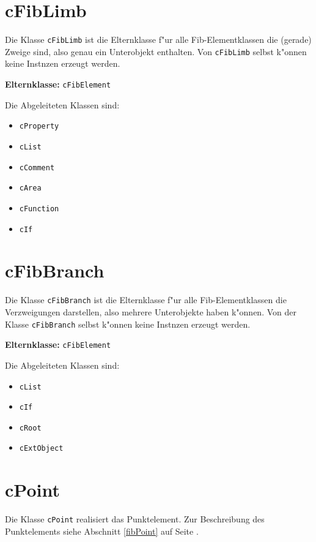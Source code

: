 \section{cFibLimb}
\label{secCFibLimb}

Die Klasse \verb|cFibLimb| ist die Elternklasse f"ur alle Fib-Elementklassen die (gerade) Zweige sind, also genau ein Unterobjekt enthalten. Von \verb|cFibLimb| selbst k"onnen keine Instnzen erzeugt werden.

\bigskip\noindent
\textbf{Elternklasse:} \verb|cFibElement|

\bigskip\noindent
Die Abgeleiteten Klassen sind:
\begin{itemize}
 \item \verb|cProperty|
 \item \verb|cList|
 \item \verb|cComment|
 \item \verb|cArea|
 \item \verb|cFunction|
 \item \verb|cIf|
\end{itemize}


\section{cFibBranch}
\label{secCFibBranch}

Die Klasse \verb|cFibBranch| ist die Elternklasse f"ur alle Fib-Elementklassen die Verzweigungen darstellen, also mehrere Unterobjekte haben k"onnen. Von der Klasse \verb|cFibBranch| selbst k"onnen keine Instnzen erzeugt werden.

\bigskip\noindent
\textbf{Elternklasse:} \verb|cFibElement|

\bigskip\noindent
Die Abgeleiteten Klassen sind:
\begin{itemize}
 \item \verb|cList|
 \item \verb|cIf|
 \item \verb|cRoot|
 \item \verb|cExtObject|
\end{itemize}


\section{cPoint}

Die Klasse \verb|cPoint| realisiert das Punktelement.
Zur Beschreibung des Punktelements siehe Abschnitt \ref{fibPoint} auf Seite \pageref{fibPoint} .


